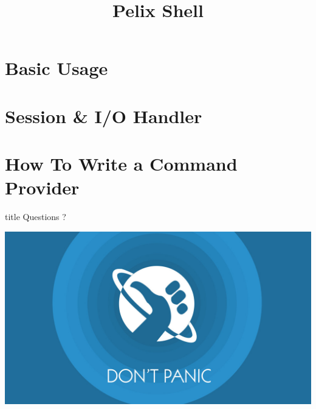 \documentclass[table]{beamer}
\title[Pelix Shell]{Pelix Shell}
\begin{document}
\frame{\titlepage}

\section{Basic Usage}


\section{Session \& I/O Handler}


\section{How To Write a Command Provider}


\begin{frame}
  \vfill
  \centering
  \begin{beamercolorbox}[sep=8pt,center,shadow=true,rounded=true]{title}
    Questions ?\par%
  \end{beamercolorbox}
  \vspace{3ex}
  \includegraphics[width=.7\textwidth]{../imgs/dont_panic}
  \vfill
\end{frame}
\end{document}

